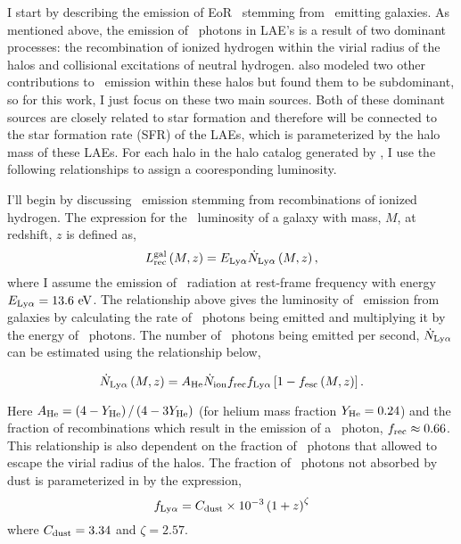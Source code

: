 \label{ref:laes}

I start by describing the emission of EoR \lya\ stemming from \lya\ emitting
galaxies. As mentioned above, the emission of \lya\ photons in LAE's is a result
of two dominant processes: the recombination of ionized hydrogen within the virial
radius of the halos and collisional excitations of neutral hydrogen. \cite{2013ApJ...763..132S}
also modeled two other contributions to \lya\ emission within these halos but
found them to be subdominant, so for this work, I just focus on these two main sources.
Both of these dominant sources are closely related to star formation and therefore
will be connected to the star formation rate (SFR) of the LAEs, which is parameterized
by the halo mass of these LAEs. For each halo in the halo catalog generated by \fastsim,
I use the following relationships to assign a cooresponding luminosity.

I'll begin by discussing \lya\ emission stemming from recombinations of ionized hydrogen.
The expression for the \lya\ luminosity of a galaxy with mass, $M$, at redshift, $z$ is defined as,
\begin{equation}
  L_{\rm rec}^{\rm gal} \left( M, z\right) = E_{\rm Ly\alpha} \dot{N}_{\rm Ly\alpha} \left( M, z\right),
\end{equation}
where I assume the emission of \lya\ radiation at rest-frame frequency
with energy $E_{\rm Ly\alpha} = 13.6 \ {\rm eV}$. The relationship above gives the
luminosity of \lya\ emission from galaxies by calculating the rate of \lya\
photons being emitted and multiplying it by the energy of \lya\ photons. The number of
\lya\ photons being emitted per second, $\dot{N}_{\rm Ly\alpha}$ can be estimated
using the relationship below,

\begin{equation}
  \dot{N}_{\rm Ly\alpha} \left( M, z\right) = A_{\rm He} \dot{N}_{\rm ion} f_{\rm rec} f_{\rm Ly\alpha} \left[ 1 - f_{\rm esc} \left( M, z\right) \right].
\end{equation}

Here $A_{\rm He} = \left(4 - Y_{\rm He} \right) / \left( 4 - 3 Y_{\rm He} \right)$ (for helium mass fraction $Y_{\rm He} = 0.24$) and
the fraction of recombinations which result in the emission of a \lya\ photon, $f_{\rm rec} \approx 0.66$.
This relationship is also dependent on the fraction of \lya\ photons that allowed to escape the virial
radius of the halos. The fraction of \lya\ photons not absorbed
by dust is parameterized in \cite{2011ApJ...730....8H} by the expression,
\begin{equation}
f_{\rm Ly\alpha} = C_{\rm dust} \times 10^{-3} \left( 1 + z\right)^{\zeta}
\end{equation}
where $C_{\rm dust} = 3.34$ and $\zeta = 2.57$.


